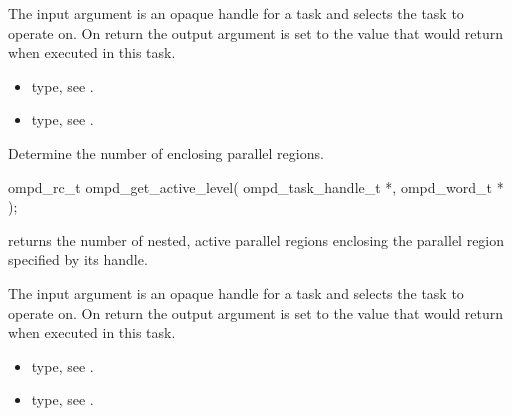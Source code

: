 \argdesc
The input argument  is an opaque handle for a task and selects the task to operate on.
On return the output argument  is set to the value that  would return 
when executed in this task.


\crossreferences
\begin{itemize}
	\item {} type, see .
	\item {} type, see .
\end{itemize}


\label{ompd:ompd_get_active_level}
\summary
Determine the number of enclosing  parallel regions.

\format
\cspecificstart
\begin{boxedcode}
ompd\_rc\_t ompd\_get\_active\_level(
  ompd\_task\_handle\_t *, 
  ompd\_word\_t *
); 
\end{boxedcode}
\cspecificend

\descr
{} returns the number of nested, active
parallel regions enclosing the parallel region specified by its handle.

\argdesc
The input argument  is an opaque handle for a task and selects the task to operate on.
On return the output argument  is set to the value that  would return when
executed in this task.

\crossreferences
\begin{itemize}
	\item {} type, see .
	\item {} type, see .
\end{itemize}

